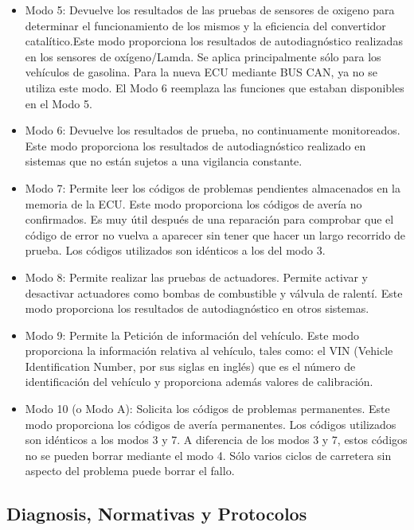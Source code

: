 \begin{itemize}
\item Modo 5: Devuelve los resultados de las pruebas de sensores de oxigeno para determinar el funcionamiento de los mismos y la eficiencia del convertidor catalítico.Este modo proporciona los resultados de autodiagnóstico realizadas en los sensores de oxígeno/Lamda. Se aplica principalmente sólo para los vehículos de gasolina. Para la nueva ECU mediante BUS CAN, ya no se utiliza este modo. El Modo 6 reemplaza las funciones que estaban disponibles en el Modo 5.

\item Modo 6: Devuelve los resultados de prueba, no continuamente monitoreados. Este modo proporciona los resultados de autodiagnóstico realizado en sistemas que no están sujetos a una vigilancia constante.

\item Modo 7: Permite leer los códigos de problemas pendientes almacenados en la memoria de la ECU. Este modo proporciona los códigos de avería no confirmados. Es muy útil después de una reparación para comprobar que el código de error no vuelva a aparecer sin tener que hacer un largo recorrido de prueba. Los códigos utilizados son idénticos a los del modo 3.

\item Modo 8: Permite realizar las pruebas de actuadores. Permite activar y desactivar actuadores como bombas de combustible y válvula de ralentí. Este modo proporciona los resultados de autodiagnóstico en otros sistemas.  

\item Modo 9: Permite la Petición de información del vehículo. Este modo proporciona la información relativa al vehículo, tales como: el VIN (Vehicle Identification Number, por sus siglas en inglés) que es el número de identificación del vehículo y proporciona además valores de calibración.

\item Modo 10 (o Modo A): Solicita los códigos de problemas permanentes. Este modo proporciona los códigos de avería permanentes. Los códigos utilizados son idénticos a los modos 3 y 7. A diferencia de los modos 3 y 7, estos códigos no se pueden borrar mediante el modo 4. Sólo varios ciclos de carretera sin aspecto del problema puede borrar el fallo.



\end{itemize}


\subsection{Diagnosis, Normativas y Protocolos}

